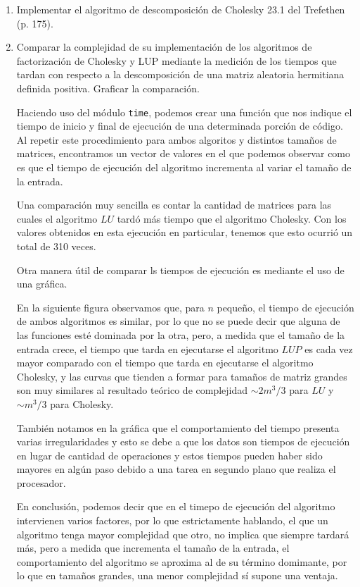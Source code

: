 \documentclass{article}
\begin{document}
\begin{enumerate}
    \item  Implementar el algoritmo de descomposición de Cholesky 23.1 del Trefethen (p. 175).

    \item Comparar la complejidad de su implementación de los algoritmos de
    factorización de Cholesky y LUP mediante la medición de los tiempos
    que tardan con respecto a la descomposición de una matriz aleatoria
    hermitiana definida positiva. Graficar la comparación.

    Haciendo uso del módulo \texttt{time}, podemos crear una función que nos indique el tiempo de 
    inicio y final de ejecución de una determinada porción de código. Al repetir este procedimiento
    para ambos algoritos y distintos tamaños de matrices, encontramos un vector de valores en el que
    podemos observar como es que el tiempo de ejecución del algoritmo incrementa al variar el 
    tamaño de la entrada.

    Una comparación muy sencilla es contar la cantidad de matrices para las cuales el algoritmo
    $LU$ tardó más tiempo que el algoritmo Cholesky. Con los valores obtenidos en esta ejecución en
    particular, tenemos que esto ocurrió un total de 310 veces.

    Otra manera útil de comparar ls tiempos de ejecución es mediante el uso de una gráfica.

    En la siguiente figura observamos que, para $n$ pequeño, el tiempo de ejecución de ambos
    algoritmos es similar, por lo que no se puede decir que alguna de las funciones esté dominada
    por la otra, pero, a medida que el tamaño de la entrada crece, el tiempo que tarda en ejecutarse
    el algoritmo $LUP$ es cada vez mayor comparado con el tiempo que tarda en ejecutarse el
    algoritmo Cholesky, y las curvas que tienden a formar para tamaños de matriz grandes son
    muy similares al resultado teórico de complejidad $\sim 2m^3/3$ para $LU$ y $\sim m^3/3$
    para Cholesky.


    \begin{figure*}[!h]
        
    \end{figure*}

    También notamos en la gráfica que el comportamiento del tiempo presenta varias irregularidades
    y esto se debe a que los datos son tiempos de ejecución en lugar de cantidad de operaciones
    y estos tiempos pueden haber sido mayores en algún paso debido a una tarea en segundo plano que
    realiza el procesador. 

    En conclusión, podemos decir que en el timepo de ejecución del algoritmo intervienen varios
    factores, por lo que estrictamente hablando, el que un algoritmo tenga mayor complejidad que
    otro, no implica que siempre tardará más, pero a medida que incrementa el tamaño de la entrada,
    el comportamiento del algoritmo se aproxima al de su término domimante, por lo que en tamaños
    grandes, una menor complejidad sí supone una ventaja.
   
\end{enumerate}




 
\end{document}
